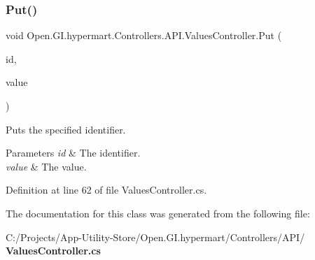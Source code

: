 \subsubsection{Put()}
{\footnotesize\ttfamily void Open.\+G\+I.\+hypermart.\+Controllers.\+A\+P\+I.\+Values\+Controller.\+Put (\begin{DoxyParamCaption}\item[{int}]{id,  }\item[{[\+From\+Body] string}]{value }\end{DoxyParamCaption})}



Puts the specified identifier. 


\begin{DoxyParams}{Parameters}
{\em id} & The identifier.\\
\hline
{\em value} & The value.\\
\hline
\end{DoxyParams}


Definition at line 62 of file Values\+Controller.\+cs.



The documentation for this class was generated from the following file\+:\begin{DoxyCompactItemize}
\item 
C\+:/\+Projects/\+App-\/\+Utility-\/\+Store/\+Open.\+G\+I.\+hypermart/\+Controllers/\+A\+P\+I/\textbf{ Values\+Controller.\+cs}\end{DoxyCompactItemize}
